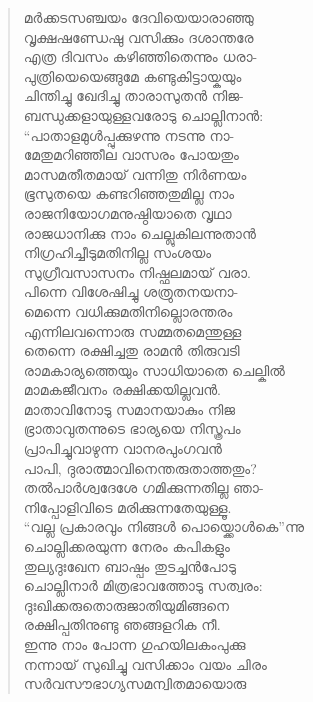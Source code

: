 \begin{verse}
മര്‍ക്കടസഞ്ചയം ദേവിയെയാരാഞ്ഞു\\
വൃക്ഷഷണ്ഡേഷു വസിക്കും ദശാന്തരേ\\
എത്ര ദിവസം കഴിഞ്ഞിതെന്നും ധരാ-\\
പുത്രിയെയെങ്ങുമേ കണ്ടുകിട്ടായ്കയും\\
ചിന്തിച്ചു ഖേദിച്ചു താരാസുതന്‍ നിജ-\\
ബന്ധുക്കളായുള്ളവരോടു ചൊല്ലിനാന്‍:\\
“പാതാളമുള്‍പ്പുക്കുഴന്നു നടന്നു നാ-\\
മേതുമറിഞ്ഞീല വാസരം പോയതും\\
മാസമതീതമായ് വന്നിതു നിര്‍ണയം\\
ഭൂസുതയെ കണ്ടറിഞ്ഞതുമില്ല നാം\\
രാജനിയോഗമനുഷ്ഠിയാതെ വൃഥാ\\
രാജധാനിക്കു നാം ചെല്ലുകിലന്നുതാന്‍\\
നിഗ്രഹിച്ചീടുമതിനില്ല സംശയം\\
സുഗ്രീവസാസനം നിഷ്ഫലമായ് വരാ.\\
പിന്നെ വിശേഷിച്ചു ശത്രുതനയനാ-\\
മെന്നെ വധിക്കുമതിനില്ലൊരന്തരം\\
എന്നിലവന്നൊരു സമ്മതമെന്തുള്ള\\
തെന്നെ രക്ഷിച്ചതു രാമന്‍ തിരുവടി\\
രാമകാര്യത്തെയും സാധിയാതെ ചെല്കില്‍\\
മാമകജീവനം രക്ഷിക്കയില്ലവന്‍.\\
മാതാവിനോടു സമാനയാകും നിജ\\
ഭ്രാതാവുതന്നുടെ ഭാര്യയെ നിസ്ത്രപം\\
പ്രാപിച്ചുവാഴുന്ന വാനരപുംഗവന്‍\\
പാപി, ദുരാത്മാവിനെന്തരുതാത്തതും?\\
തല്‍പാര്‍ശ്വദേശേ ഗമിക്കുന്നതില്ല ഞാ-\\
നിപ്പോളിവിടെ മരിക്കുന്നതേയുള്ളൂ.\\
“വല്ല പ്രകാരവും നിങ്ങള്‍ പൊയ്ക്കൊള്‍കെ”ന്നു\\
ചൊല്ലിക്കരയുന്ന നേരം കപികളും\\
തുല്യദുഃഖേന ബാഷ്പം തുടച്ചന്‍പോടു\\
ചൊല്ലിനാര്‍ മിത്രഭാവത്തോടു സത്വരം:\\
ദുഃഖിക്കരുതൊരുജാതിയുമിങ്ങനെ\\
രക്ഷിപ്പതിനുണ്ടു ഞങ്ങളറിക നീ.\\
ഇന്നു നാം പോന്ന ഗുഹയിലകംപുക്കു\\
നന്നായ് സുഖിച്ചു വസിക്കാം വയം ചിരം\\
സര്‍വസൗഭാഗ്യസമന്വിതമായൊരു\\

\end{verse}
